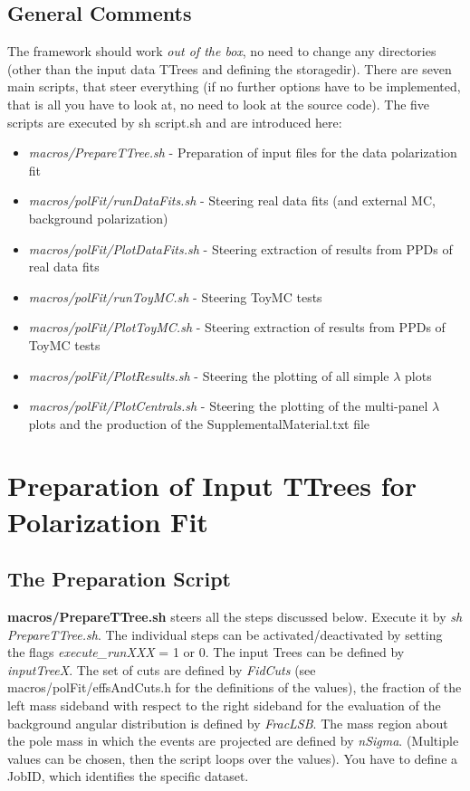 \documentclass{article}
\begin{document}
\subsection{General Comments}

The framework should work \emph{out of the box}, no need to change any directories (other than the input data TTrees and defining the storagedir). There are seven main scripts, that steer everything (if no further options have to be implemented, that is all you have to look at, no need to look at the source code). The five scripts are executed by sh script.sh and are introduced here:

\begin{itemize}
\item{\emph{macros/PrepareTTree.sh} - Preparation of input files for the data polarization fit}
\item{\emph{macros/polFit/runDataFits.sh} - Steering real data fits (and external MC, background polarization)}
\item{\emph{macros/polFit/PlotDataFits.sh} - Steering extraction of results from PPDs of real data fits}
\item{\emph{macros/polFit/runToyMC.sh} - Steering ToyMC tests}
\item{\emph{macros/polFit/PlotToyMC.sh} - Steering extraction of results from PPDs of ToyMC tests}
\item{\emph{macros/polFit/PlotResults.sh} - Steering the plotting of all simple $\lambda$ plots}
\item{\emph{macros/polFit/PlotCentrals.sh} - Steering the plotting of the multi-panel $\lambda$ plots and the production of the SupplementalMaterial.txt file}
\end{itemize}

\section{Preparation of Input TTrees for Polarization Fit}

\subsection{The Preparation Script}  

{\bf macros/PrepareTTree.sh} steers all the steps discussed below. Execute it by \emph{sh PrepareTTree.sh}. The individual steps can be activated/deactivated by setting the flags \emph{execute\_runXXX} = 1 or 0. The input Trees can be defined by \emph{inputTreeX}. The set of cuts are defined by \emph{FidCuts} (see macros/polFit/effsAndCuts.h for the definitions of the values), the fraction of the left mass sideband with respect to the right sideband for the evaluation of the background angular distribution is defined by \emph{FracLSB}. The mass region about the pole mass in which the events are projected are defined by \emph{nSigma}. (Multiple values can be chosen, then the script loops over the values).
You have to define a JobID, which identifies the specific dataset.
\end{document}
